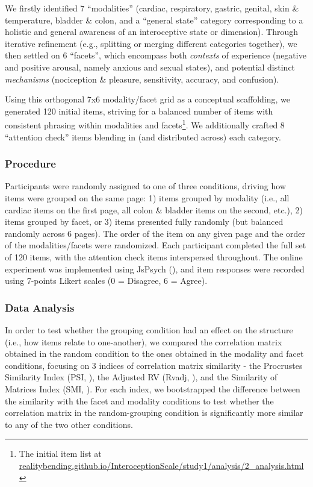 \documentclass[
  jou,
  floatsintext,
  longtable,
  nolmodern,
  notxfonts,
  notimes,
  colorlinks=true,linkcolor=blue,citecolor=blue,urlcolor=blue]{apa7}
\begin{document}
We firstly identified 7 ``modalities'' (cardiac, respiratory, gastric,
genital, skin \& temperature, bladder \& colon, and a ``general state''
category corresponding to a holistic and general awareness of an
interoceptive state or dimension). Through iterative refinement (e.g.,
splitting or merging different categories together), we then settled on
6 ``facets'', which encompass both \emph{contexts} of experience
(negative and positive arousal, namely anxious and sexual states), and
potential distinct \emph{mechanisms} (nociception \& pleasure,
sensitivity, accuracy, and confusion).

Using this orthogonal 7x6 modality/facet grid as a conceptual
scaffolding, we generated 120 initial items, striving for a balanced
number of items with consistent phrasing within modalities and
facets\footnote{The initial item list at
  \href{https://realitybending.github.io/InteroceptionScale/study1/analysis/2_analysis.html}{realitybending.github.io/InteroceptionScale/study1/analysis/2\_analysis.html}}.
We additionally crafted 8 ``attention check'' items blending in (and
distributed across) each category.

\subsubsection{Procedure}\label{procedure}

Participants were randomly assigned to one of three conditions, driving
how items were grouped on the same page: 1) items grouped by modality
(i.e., all cardiac items on the first page, all colon \& bladder items
on the second, etc.), 2) items grouped by facet, or 3) items presented
fully randomly (but balanced randomly across 6 pages). The order of the
item on any given page and the order of the modalities/facets were
randomized. Each participant completed the full set of 120 items, with
the attention check items interspersed throughout. The online experiment
was implemented using JsPsych (), and item responses were recorded using 7-points Likert scales (0
= Disagree, 6 = Agree).

\subsubsection{Data Analysis}\label{data-analysis}

In order to test whether the grouping condition had an effect on the
structure (i.e., how items relate to one-another), we compared the
correlation matrix obtained in the random condition to the ones obtained
in the modality and facet conditions, focusing on 3 indices of
correlation matrix similarity - the Procrustes Similarity Index (PSI,
), the Adjusted RV (Rvadj,
), and the
Similarity of Matrices Index (SMI,
). For each
index, we bootstrapped the difference between the similarity with the
facet and modality conditions to test whether the correlation matrix in
the random-grouping condition is significantly more similar to any of
the two other conditions.
\end{document}
